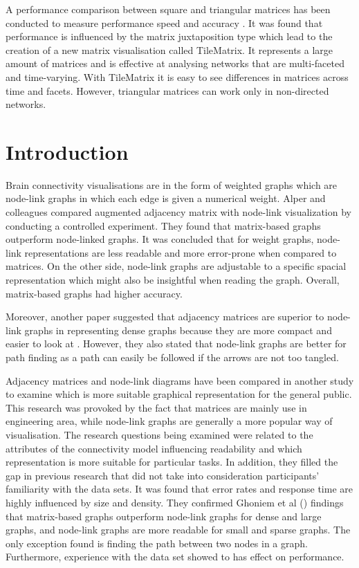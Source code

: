 \documentclass{l4proj}
\begin{document}
A performance comparison between square and triangular matrices has been conducted to measure performance speed and accuracy \cite{liu2015effects}. It was found that performance is influenced by the matrix juxtaposition type which lead to the creation of a new matrix visualisation called TileMatrix. It represents a large amount of matrices and is effective at analysing networks that are multi-faceted and time-varying. With TileMatrix it is easy to see differences in matrices across time and facets. However, triangular matrices can work only in non-directed networks. 
\chapter{Introduction}

Brain connectivity visualisations are in the form of weighted graphs which are node-link graphs in which each edge is given a numerical weight. Alper and colleagues \cite{alper2013weighted} compared augmented adjacency matrix with node-link visualization by conducting a controlled experiment. They found that matrix-based graphs outperform node-linked graphs. It was concluded that for weight graphs, node-link representations are less readable and more error-prone when compared to matrices. On the other side, node-link graphs are adjustable to a specific spacial representation which might also be insightful when reading the graph. Overall, matrix-based graphs had higher accuracy.  

Moreover, another paper suggested that adjacency matrices are superior to node-link graphs in representing dense graphs because they are more compact and easier to look at \cite{sheny2007path}. However, they also stated that node-link graphs are better for path finding as a path can easily be followed if the arrows are not too tangled.





Adjacency matrices and node-link diagrams have been compared in another study \cite{keller2006matrices} to examine which is more suitable graphical representation for the general public. This research was provoked by the fact that matrices are mainly use in engineering area, while node-link graphs are generally a more popular way of visualisation. The research questions being examined were related to the attributes of the connectivity model influencing readability and which representation is more suitable for particular tasks. In addition, they filled the gap in previous research that did not take into consideration participants' familiarity with the data sets. It was found that error rates and response time are highly influenced by size and density. They confirmed Ghoniem et al () findings that matrix-based graphs outperform node-link graphs for dense and large graphs, and node-link graphs are more readable for small and sparse graphs. The only exception found is finding the path between two nodes in a graph. Furthermore, experience with the data set showed to has effect on performance. 
\end{document}
